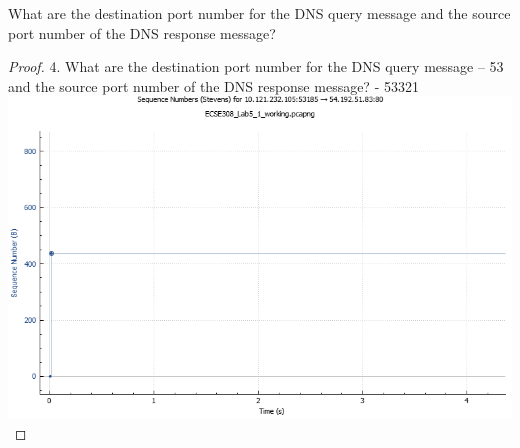\documentclass[../../main.tex]{subfiles}
\begin{document}
\begin{wts}
What are the destination port number for the DNS query message and the source port number of the DNS response message?
\end{wts}
\begin{proof}
4. What are the destination port number for the DNS query message – 53 and the source port number of the DNS response message? - 53321
\includegraphics[width=\textwidth]{subfiles/images/ECSE_308_Lab_5_1_SUPA_PAGE5_18_Image53.png}
\end{proof}
\end{document}
